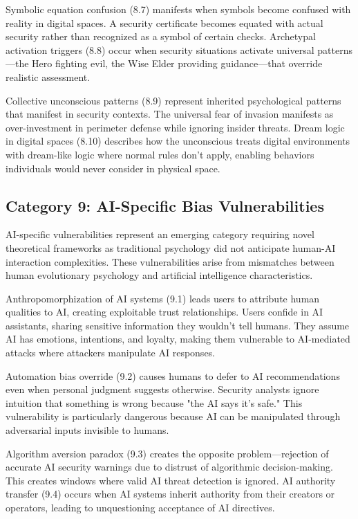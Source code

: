 \documentclass[manuscript,screen,review]{acmart}
\begin{document}
Symbolic equation confusion (8.7) manifests when symbols become confused with reality in digital spaces. A security certificate becomes equated with actual security rather than recognized as a symbol of certain checks. Archetypal activation triggers (8.8) occur when security situations activate universal patterns—the Hero fighting evil, the Wise Elder providing guidance—that override realistic assessment.

Collective unconscious patterns (8.9) represent inherited psychological patterns that manifest in security contexts. The universal fear of invasion manifests as over-investment in perimeter defense while ignoring insider threats. Dream logic in digital spaces (8.10) describes how the unconscious treats digital environments with dream-like logic where normal rules don't apply, enabling behaviors individuals would never consider in physical space.

\subsection{Category 9: AI-Specific Bias Vulnerabilities}

AI-specific vulnerabilities represent an emerging category requiring novel theoretical frameworks as traditional psychology did not anticipate human-AI interaction complexities. These vulnerabilities arise from mismatches between human evolutionary psychology and artificial intelligence characteristics.

Anthropomorphization of AI systems (9.1) leads users to attribute human qualities to AI, creating exploitable trust relationships. Users confide in AI assistants, sharing sensitive information they wouldn't tell humans. They assume AI has emotions, intentions, and loyalty, making them vulnerable to AI-mediated attacks where attackers manipulate AI responses.

Automation bias override (9.2) causes humans to defer to AI recommendations even when personal judgment suggests otherwise. Security analysts ignore intuition that something is wrong because "the AI says it's safe." This vulnerability is particularly dangerous because AI can be manipulated through adversarial inputs invisible to humans.

Algorithm aversion paradox (9.3) creates the opposite problem—rejection of accurate AI security warnings due to distrust of algorithmic decision-making. This creates windows where valid AI threat detection is ignored. AI authority transfer (9.4) occurs when AI systems inherit authority from their creators or operators, leading to unquestioning acceptance of AI directives.
\end{document}
